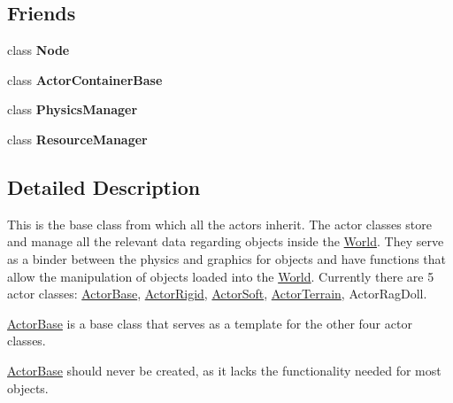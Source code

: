 \subsection*{Friends}
\begin{DoxyCompactItemize}
\item 
\hypertarget{classphys_1_1ActorBase_a6db9d28bd448a131448276ee03de1e6d}{
class {\bfseries Node}}
\label{d8/d0f/classphys_1_1ActorBase_a6db9d28bd448a131448276ee03de1e6d}

\item 
\hypertarget{classphys_1_1ActorBase_a54042fcfa7ab444a50ec79cbe3395356}{
class {\bfseries ActorContainerBase}}
\label{d8/d0f/classphys_1_1ActorBase_a54042fcfa7ab444a50ec79cbe3395356}

\item 
\hypertarget{classphys_1_1ActorBase_a139cf05ac01161b7071c8a037c841683}{
class {\bfseries PhysicsManager}}
\label{d8/d0f/classphys_1_1ActorBase_a139cf05ac01161b7071c8a037c841683}

\item 
\hypertarget{classphys_1_1ActorBase_a54c1252abc87a78a301e6b6984470408}{
class {\bfseries ResourceManager}}
\label{d8/d0f/classphys_1_1ActorBase_a54c1252abc87a78a301e6b6984470408}

\end{DoxyCompactItemize}


\subsection{Detailed Description}
This is the base class from which all the actors inherit. The actor classes store and manage all the relevant data regarding objects inside the \hyperlink{classphys_1_1World}{World}. They serve as a binder between the physics and graphics for objects and have functions that allow the manipulation of objects loaded into the \hyperlink{classphys_1_1World}{World}. Currently there are 5 actor classes: \hyperlink{classphys_1_1ActorBase}{ActorBase}, \hyperlink{classphys_1_1ActorRigid}{ActorRigid}, \hyperlink{classphys_1_1ActorSoft}{ActorSoft}, \hyperlink{classphys_1_1ActorTerrain}{ActorTerrain}, ActorRagDoll. \par
 \hyperlink{classphys_1_1ActorBase}{ActorBase} is a base class that serves as a template for the other four actor classes. \par
 \hyperlink{classphys_1_1ActorBase}{ActorBase} should never be created, as it lacks the functionality needed for most objects. 

